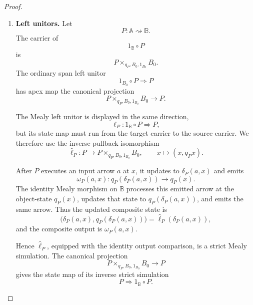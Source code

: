 \begin{proof}
\begin{enumerate}
        Under the canonical identification of both carriers with the same
        triple-pullback object, the two parenthesized pipelines execute \(P\),
        then \(Q\), then \(R\). They therefore have the same transition map
        and emit the same output arrow. Consequently
        \(\widehat a_{P,Q,R}\), equipped with the identity output comparison,
        is a strict Mealy simulation.

        The ordinary span-associator apex map gives the state map of the
        inverse Mealy simulation
        \[
            R\circ(Q\circ P)
            \Rightarrow
            (R\circ Q)\circ P.
        \]
        Hence the Mealy associator is invertible.

        \item \textbf{Left unitors.}
        Let
        \[
            P:\mathbb A\rightsquigarrow\mathbb B.
        \]
        The carrier of
        \[
            1_{\mathbb B}\circ P
        \]
        is
        \[
            P\times_{q_P,B_0,1_{B_0}}B_0.
        \]
        The ordinary span left unitor
        \[
            1_{B_0}\circ P\Longrightarrow P
        \]
        has apex map the canonical projection
        \[
            P\times_{q_P,B_0,1_{B_0}}B_0\to P.
        \]

        The Mealy left unitor is displayed in the same direction,
        \[
            \ell_P:
            1_{\mathbb B}\circ P
            \Rightarrow
            P,
        \]
        but its state map must run from the target carrier to the source
        carrier. We therefore use the inverse pullback isomorphism
        \[
            \widehat\ell_P:
            P\longrightarrow
            P\times_{q_P,B_0,1_{B_0}}B_0,
            \qquad
            x\longmapsto(x,q_Px).
        \]

        After \(P\) executes an input arrow \(a\) at \(x\), it updates to
        \(\delta_P(a,x)\) and emits
        \[
            \omega_P(a,x):
            q_P(\delta_P(a,x))\to q_P(x).
        \]
        The identity Mealy morphism on \(\mathbb B\) processes this emitted
        arrow at the object-state \(q_P(x)\), updates that state to
        \(q_P(\delta_P(a,x))\), and emits the same arrow. Thus the updated
        composite state is
        \[
            \bigl(
                \delta_P(a,x),
                q_P(\delta_P(a,x))
            \bigr)
            =
            \widehat\ell_P(\delta_P(a,x)),
        \]
        and the composite output is \(\omega_P(a,x)\).

        Hence \(\widehat\ell_P\), equipped with the identity output comparison,
        is a strict Mealy simulation. The canonical projection
        \[
            P\times_{q_P,B_0,1_{B_0}}B_0\to P
        \]
        gives the state map of its inverse strict simulation
        \[
            P\Rightarrow1_{\mathbb B}\circ P.
        \]


\end{enumerate}
\end{proof}
